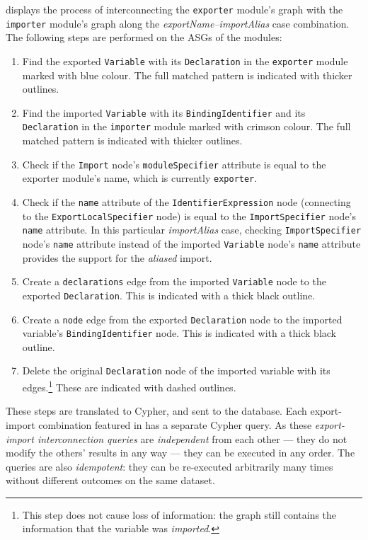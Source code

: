  displays the process of interconnecting the \lstinline{exporter} module's graph with the \lstinline{importer} module's graph along the \emph{exportName–importAlias} case combination. The following steps are performed on the ASGs of the modules:
\begin{enumerate}
\item Find the exported \lstinline{Variable} with its \lstinline{Declaration} in the \lstinline{exporter} module marked with blue colour. The full matched pattern is indicated with thicker outlines.
\item Find the imported \lstinline{Variable} with its \lstinline{BindingIdentifier} and its \lstinline{Declaration} in the \lstinline{importer} module marked with crimson colour. The full matched pattern is indicated with thicker outlines.
\item Check if the \lstinline{Import} node's \lstinline{moduleSpecifier} attribute is equal to the exporter module's name, which is currently \lstinline{exporter}.
\item Check if the \lstinline{name} attribute of the \lstinline{IdentifierExpression} node (connecting to the \lstinline{ExportLocalSpecifier} node) is equal to the \lstinline{ImportSpecifier} node's \lstinline{name} attribute. In this particular \emph{importAlias} case, checking \lstinline{ImportSpecifier} node's \lstinline{name} attribute instead of the imported \lstinline{Variable} node's \lstinline{name} attribute provides the support for the \emph{aliased} import.
\item Create a \lstinline{declarations} edge from the imported \lstinline{Variable} node to the exported \lstinline{Declaration}. This is indicated with a thick black outline.
\item Create a \lstinline{node} edge from the exported \lstinline{Declaration} node to the imported variable's \lstinline{BindingIdentifier} node. This is indicated with a thick black outline.
\item Delete the original \lstinline{Declaration} node of the imported variable with its edges.\footnote{This step does not cause loss of information: the graph still contains the information that the variable was \emph{imported}.} These are indicated with dashed outlines.
\end{enumerate}

These steps are translated to Cypher, and sent to the database. Each export-import combination featured in  has a separate Cypher query. As these \emph{export-import interconnection queries} are \emph{independent} from each other — they do not modify the others' results in any way — they can be executed in any order. The queries are also \emph{idempotent}: they can be re-executed arbitrarily many times without different outcomes on the same dataset.

